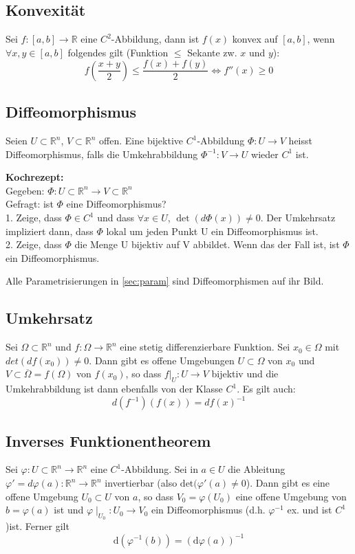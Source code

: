 \documentclass[8pt, a4paper, landscape, fleqn]{scrartcl}
\newenvironment {example}
				{\begin{itshape} \begin{small}}
				{\end{small} \end{itshape}}
\def\d{\text{d}}
\begin{document}
\begin{multicols*}{3}
			\subsection{Konvexität}
			\label{sec:konvex}
				Sei $f:[a, b] \to \mathbb{R}$ eine $C^2$-Abbildung, dann ist $f(x)$ konvex auf $[a, b]$, wenn $\forall x, y \in [a, b]$ folgendes gilt (Funktion $\leq$ Sekante zw. $x$ und $y$):
				\begin{equation*}
					f\left(\frac{x+y}{2}\right)\le \frac{f(x)+f(y)}{2} \Leftrightarrow f''(x) \ge 0
				\end{equation*}
			\subsection{Diffeomorphismus}
				Seien $U \subset \mathbb{R}^n$, $V \subset \mathbb{R}^n$ offen. Eine bijektive $C^1$-Abbildung $\Phi: U \to V$ heisst Diffeomorphismus, falls die Umkehrabbildung $\Phi^{-1}: V \to U$ wieder $C^1$ ist.\\
				\begin{example}{\textbf{Kochrezept: }\\}
				    Gegeben: $\Phi: U \subset \mathbb{R}^n \rightarrow V \subset \mathbb{R}^n$\\
				    Gefragt: ist $\Phi$ eine Diffeomorphismus?\\
				    1. Zeige, dass $\Phi \in C^1$ und dass $\forall x \in U$, $\det(d\Phi(x)) \neq 0$. Der Umkehrsatz impliziert dann, dass $\Phi$ lokal um jeden Punkt U ein Diffeomorphismus ist.\\
				    2. Zeige, dass $\Phi$ die Menge U bijektiv auf V abbildet. Wenn das der Fall ist, ist $\Phi$ ein Diffeomorphismus.
				\end{example}
				Alle Parametrisierungen in \ref{sec:param} sind Diffeomorphismen auf ihr Bild.
			\subsection{Umkehrsatz}
			    Sei $\Omega \subset \mathbb{R}^n$ und $f: \Omega \rightarrow \mathbb{R}^n$ eine stetig differenzierbare Funktion. Sei $x_0 \in \Omega$ mit $det(df(x_0)) \neq 0$. Dann gibt es offene Umgebungen $U \subset \Omega$ von $x_0$ und $V\subset \overline{\Omega} = f(\Omega)$ von $f(x_0)$, so dass $f\vert_U : U \rightarrow V$ bijektiv und die Umkehrabbildung ist dann ebenfalls von der Klasse $C^1$. Es gilt auch: \[d(f^{-1})(f(x)) = df(x)^{-1}\]
			\subsection{Inverses Funktionentheorem}
				Sei $\varphi: U \subset \mathbb{R}^n \rightarrow \mathbb{R}^n$ eine
				$C^1$-Abbildung. Sei in $a \in U$ die Ableitung $\varphi'=d\varphi(a): \mathbb{R}^n \to \mathbb{R}^n$ invertierbar (also $\text{det}(\varphi'(a) \ne 0$). Dann gibt es eine offene Umgebung $U_0 \subset U$ von $a$, so dass $V_0=\varphi(U_0)$ eine offene Umgebung von $b=\varphi(a)$ ist und $\varphi\mid_{U_0}: U_0 \to V_0$ ein Diffeomorphismus (d.h. $\varphi^{-1}$ ex. und ist $C^1$)ist. Ferner gilt
				\begin{equation*}
					\d(\varphi^{-1}(b))=(\d\varphi(a))^{-1}
				\end{equation*}

\end{multicols*}
\end{document}
